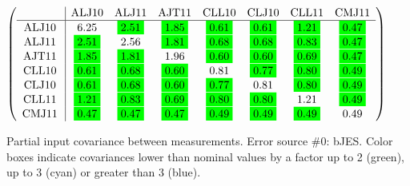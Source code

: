 \begin{table}[H]
\scriptsize
\begin{center}
\renewcommand{\arraystretch}{1.1}
\begin{math}\left(\begin{array}{c|ccccccc}
 & \mathrm{ALJ10} & 
\mathrm{ALJ11} & 
\mathrm{AJT11} & 
\mathrm{CLL10} & 
\mathrm{CLJ10} & 
\mathrm{CLL11} & 
\mathrm{CMJ11} \\
\hline
\mathrm{ALJ10} \hspace*{2pt} &       6.25 &  \colorbox{Green1}{$      2.51$} &  \colorbox{Green1}{$      1.85$} &  \colorbox{Green1}{$      0.61$} &  \colorbox{Green1}{$      0.61$} &  \colorbox{Green1}{$      1.21$} &  \colorbox{Green1}{$      0.47$} \\
\mathrm{ALJ11} \hspace*{2pt} &  \colorbox{Green1}{$      2.51$} &       2.56 &  \colorbox{Green1}{$      1.81$} &  \colorbox{Green1}{$      0.68$} &  \colorbox{Green1}{$      0.68$} &  \colorbox{Green1}{$      0.83$} &  \colorbox{Green1}{$      0.47$} \\
\mathrm{AJT11} \hspace*{2pt} &  \colorbox{Green1}{$      1.85$} &  \colorbox{Green1}{$      1.81$} &       1.96 &  \colorbox{Green1}{$      0.60$} &  \colorbox{Green1}{$      0.60$} &  \colorbox{Green1}{$      0.69$} &  \colorbox{Green1}{$      0.47$} \\
\mathrm{CLL10} \hspace*{2pt} &  \colorbox{Green1}{$      0.61$} &  \colorbox{Green1}{$      0.68$} &  \colorbox{Green1}{$      0.60$} &       0.81 &  \colorbox{Green1}{$      0.77$} &  \colorbox{Green1}{$      0.80$} &  \colorbox{Green1}{$      0.49$} \\
\mathrm{CLJ10} \hspace*{2pt} &  \colorbox{Green1}{$      0.61$} &  \colorbox{Green1}{$      0.68$} &  \colorbox{Green1}{$      0.60$} &  \colorbox{Green1}{$      0.77$} &       0.81 &  \colorbox{Green1}{$      0.80$} &  \colorbox{Green1}{$      0.49$} \\
\mathrm{CLL11} \hspace*{2pt} &  \colorbox{Green1}{$      1.21$} &  \colorbox{Green1}{$      0.83$} &  \colorbox{Green1}{$      0.69$} &  \colorbox{Green1}{$      0.80$} &  \colorbox{Green1}{$      0.80$} &       1.21 &  \colorbox{Green1}{$      0.49$} \\
\mathrm{CMJ11} \hspace*{2pt} &  \colorbox{Green1}{$      0.47$} &  \colorbox{Green1}{$      0.47$} &  \colorbox{Green1}{$      0.47$} &  \colorbox{Green1}{$      0.49$} &  \colorbox{Green1}{$      0.49$} &  \colorbox{Green1}{$      0.49$} &       0.49 \\
\end{array}\right)\end{math}
\caption{Partial input covariance between measurements. Error source \#0: bJES. Color boxes indicate covariances lower than nominal values by a factor up to 2 (green), up to 3 (cyan) or greater than 3 (blue).}
\renewcommand{\arraystretch}{1}
\end{center}
\end{table}
\clearpage
